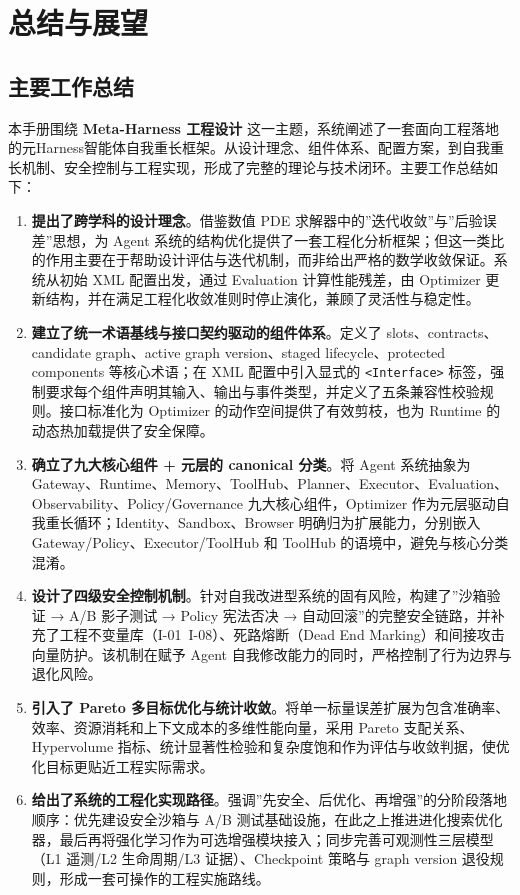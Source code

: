 \chapter{总结与展望}

\section{主要工作总结}

本手册围绕 \textbf{Meta-Harness 工程设计} 这一主题，系统阐述了一套面向工程落地的元Harness智能体自我重长框架。从设计理念、组件体系、配置方案，到自我重长机制、安全控制与工程实现，形成了完整的理论与技术闭环。主要工作总结如下：

\begin{enumerate}
    \item \textbf{提出了跨学科的设计理念}。借鉴数值 PDE 求解器中的”迭代收敛”与”后验误差”思想，为 Agent 系统的结构优化提供了一套工程化分析框架；但这一类比的作用主要在于帮助设计评估与迭代机制，而非给出严格的数学收敛保证。系统从初始 XML 配置出发，通过 Evaluation 计算性能残差，由 Optimizer 更新结构，并在满足工程化收敛准则时停止演化，兼顾了灵活性与稳定性。

    \item \textbf{建立了统一术语基线与接口契约驱动的组件体系}。定义了 slots、contracts、candidate graph、active graph version、staged lifecycle、protected components 等核心术语；在 XML 配置中引入显式的 \texttt{<Interface>} 标签，强制要求每个组件声明其输入、输出与事件类型，并定义了五条兼容性校验规则。接口标准化为 Optimizer 的动作空间提供了有效剪枝，也为 Runtime 的动态热加载提供了安全保障。

    \item \textbf{确立了九大核心组件 + 元层的 canonical 分类}。将 Agent 系统抽象为 Gateway、Runtime、Memory、ToolHub、Planner、Executor、Evaluation、Observability、Policy/Governance 九大核心组件，Optimizer 作为元层驱动自我重长循环；Identity、Sandbox、Browser 明确归为扩展能力，分别嵌入 Gateway/Policy、Executor/ToolHub 和 ToolHub 的语境中，避免与核心分类混淆。

    \item \textbf{设计了四级安全控制机制}。针对自我改进型系统的固有风险，构建了”沙箱验证 → A/B 影子测试 → Policy 宪法否决 → 自动回滚”的完整安全链路，并补充了工程不变量库（I-01~I-08）、死路熔断（Dead End Marking）和间接攻击向量防护。该机制在赋予 Agent 自我修改能力的同时，严格控制了行为边界与退化风险。

    \item \textbf{引入了 Pareto 多目标优化与统计收敛}。将单一标量误差扩展为包含准确率、效率、资源消耗和上下文成本的多维性能向量，采用 Pareto 支配关系、Hypervolume 指标、统计显著性检验和复杂度饱和作为评估与收敛判据，使优化目标更贴近工程实际需求。

    \item \textbf{给出了系统的工程化实现路径}。强调”先安全、后优化、再增强”的分阶段落地顺序：优先建设安全沙箱与 A/B 测试基础设施，在此之上推进进化搜索优化器，最后再将强化学习作为可选增强模块接入；同步完善可观测性三层模型（L1 遥测/L2 生命周期/L3 证据）、Checkpoint 策略与 graph version 退役规则，形成一套可操作的工程实施路线。
\end{enumerate}

